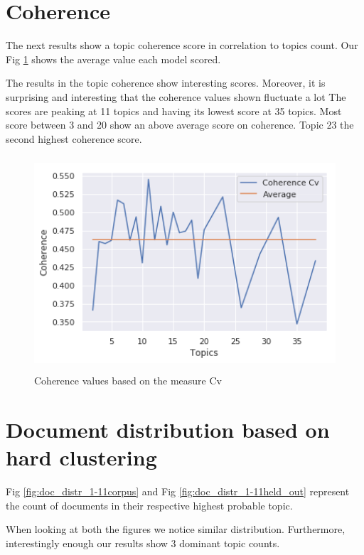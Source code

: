 \FloatBarrier
\section{Coherence}\label{results:coherence}
The next results show a topic coherence score in correlation to topics count. Our Fig \ref{fig:coherence} shows the average value each model scored. 

The results in the topic coherence show interesting scores. Moreover, it is surprising and interesting that the coherence values shown fluctuate a lot The scores are peaking at 11 topics and having its lowest score at 35 topics. Most score between 3 and 20 show an above average score on coherence. Topic 23 the second highest coherence score. 

 \begin{figure}[h]
    \centering
    \includegraphics[width=15cm, height=8cm]{figures/coherence_values_topics.png}
    \caption{Coherence values based on the measure Cv}
    \label{fig:coherence}
\end{figure}

\FloatBarrier
\section{Document distribution based on hard clustering}\label{results:doc_distribution}
Fig \ref{fig:doc_distr_1-11corpus} and Fig \ref{fig:doc_distr_1-11held_out} represent the count of documents in their respective highest probable topic. 

When looking at both the figures we notice similar distribution. Furthermore, interestingly enough our results show 3 dominant topic counts. 

